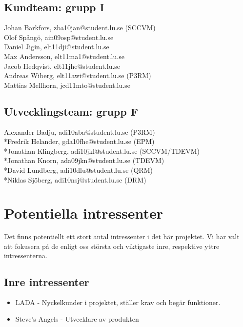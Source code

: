 \documentclass[10pt]{article}
\begin{document}
\subsection{Kundteam: grupp I}
\noindent
Johan Barkfors, zba10jan@student.lu.se (SCCVM)
\\Olof Spångö, ain09osp@student.lu.se
\\Daniel Jigin, elt11dji@student.lu.se
\\Max Andersson, elt11ma1@student.lu.se
\\Jacob Hedqvist, elt11jhe@student.lu.se
\\Andreas Wiberg, elt11awi@student.lu.se (P3RM)
\\Mattias Mellhorn, jcd11mto@student.lu.se


\subsection{Utvecklingsteam: grupp F}
\noindent
Alexander Badju, adi10aba@student.lu.se (P3RM)	
\\*Fredrik Helander, gda10fhe@student.lu.se (EPM)
\\*Jonathan Klingberg, adi10jkl@student.lu.se (SCCVM/TDEVM)
\\*Jonathan Knorn, ada09jkn@student.lu.se (TDEVM)
\\*David Lundberg, adi10dlu@student.lu.se (QRM)
\\*Niklas Sjöberg, adi10nsj@student.lu.se (DRM)

\section{Potentiella intressenter}
\sloppy
\noindent
Det finns potentiellt ett stort antal intressenter i det här projektet. Vi har valt att fokusera på de enligt oss största och viktigaste inre, respektive yttre intressenterna.

\subsection{Inre intressenter}
\noindent
\begin{itemize}
	\setlength\itemsep{0.1em}
	\item LADA - Nyckelkunder i projektet, ställer krav och begär funktioner.
	\item Steve’s Angels - Utvecklare av produkten
\end{itemize}
\end{document}
